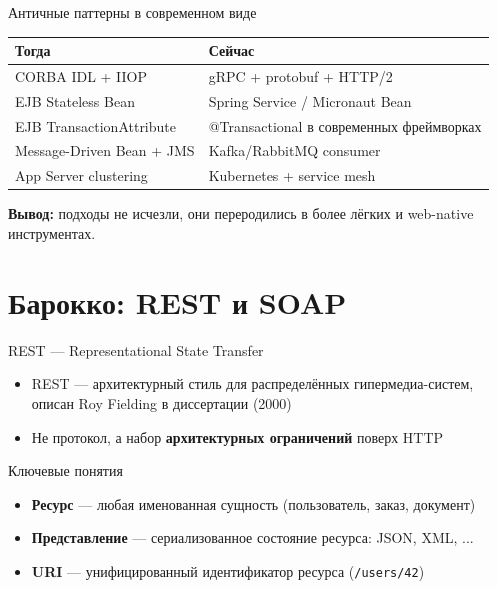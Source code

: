 \documentclass{beamer}
\begin{document}
\begin{frame}{Античные паттерны в современном виде}
\begin{center}
\begin{tabular}{ll}
\textbf{Тогда}                     & \textbf{Сейчас}                         \\ \hline
CORBA IDL + IIOP                   & gRPC + protobuf + HTTP/2                \\
EJB Stateless Bean                 & Spring Service / Micronaut Bean         \\
EJB TransactionAttribute           & @Transactional в современных фреймворках\\
Message-Driven Bean + JMS          & Kafka/RabbitMQ consumer                 \\
App Server clustering              & Kubernetes + service mesh               \\
\end{tabular}
\end{center}
\vspace{0.3cm}
\textbf{Вывод:} подходы не исчезли, они переродились в более лёгких и web-native инструментах.
\end{frame}


\section{Барокко: REST и SOAP}

\begin{frame}{REST --- Representational State Transfer}
\begin{itemize}
  \item REST --- архитектурный стиль для распределённых гипермедиа-систем, описан Roy Fielding в диссертации (2000)
  \item Не протокол, а набор \textbf{архитектурных ограничений} поверх HTTP
\end{itemize}
\begin{block}{Ключевые понятия}
\begin{itemize}
  \item \textbf{Ресурс} --- любая именованная сущность (пользователь, заказ, документ)
  \item \textbf{Представление} --- сериализованное состояние ресурса: JSON, XML, ...
  \item \textbf{URI} --- унифицированный идентификатор ресурса (\texttt{/users/42})
\end{itemize}
\end{block}
\end{frame}
\end{document}
